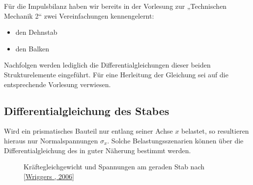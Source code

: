 \documentclass[letterpaper,10pt,german]{jupyterBook}
\let\sphinxpxdimen\pdfpxdimen\else\newdimen\sphinxpxdimen
\begin{document}
\sphinxAtStartPar
Für die Impulsbilanz haben wir bereits in der Vorlesung zur „Technischen Mechanik 2“ zwei Vereinfachungen kennengelernt:
\begin{itemize}
\item {} 
\sphinxAtStartPar
den Dehnstab

\item {} 
\sphinxAtStartPar
den Balken

\end{itemize}

\sphinxAtStartPar
Nachfolgen werden lediglich die Differentialgleichungen dieser beiden Strukturelemente eingeführt. Für eine Herleitung der Gleichung sei auf die entsprechende Vorlesung verwiesen.


\subsection{Differentialgleichung des Stabes}
\label{\detokenize{chapters/chapter1/strukturgleichungen:differentialgleichung-des-stabes}}
\sphinxAtStartPar
Wird ein prismatisches Bauteil nur entlang seiner Achse \(x\) belastet, so resultieren hieraus nur Normalspannungen \(\sigma_x\). Solche Belastungsszenarien können über die Differentialgleichung des  in guter Näherung bestimmt werden.

\begin{figure}[htbp]
\centering
\capstart

\noindent\sphinxincludegraphics[width=600\sphinxpxdimen]{{Stab_TMKompakt}.png}
\caption{Kräftegleichgewicht und Spannungen am geraden Stab nach {[}\hyperlink{cite.quellen:id12}{Wriggers , 2006}{]}}\label{\detokenize{chapters/chapter1/strukturgleichungen:stab}}\end{figure}
\end{document}
